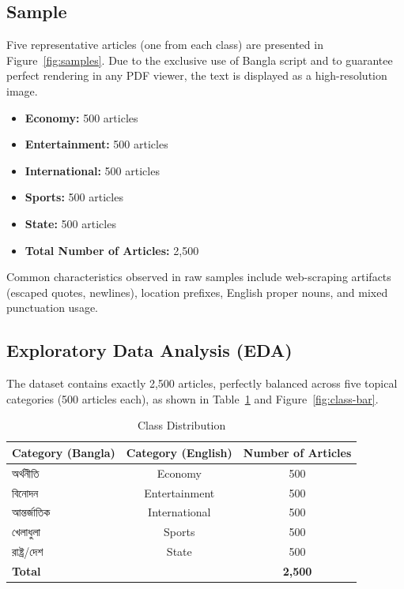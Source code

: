 \documentclass[pdflatex,sn-mathphys-num]{sn-jnl}
\newcommand{\bn}[1]{{\bengalifont #1}}
\theoremstyle{thmstyleone}\newtheorem{theorem}{Theorem}
\theoremstyle{thmstyletwo}\newtheorem{example}{Example}\newtheorem{remark}{Remark}
\theoremstyle{thmstylethree}\newtheorem{definition}{Definition}
\begin{document}
\subsection{Sample}
\label{subsec:sample}

Five representative articles (one from each class) are presented in Figure~\ref{fig:samples}. Due to the exclusive use of Bangla script and to guarantee perfect rendering in any PDF viewer, the text is displayed as a high-resolution image.

\begin{itemize}
    \item \textbf{Economy:} 500 articles
    \item \textbf{Entertainment:} 500 articles
    \item \textbf{International:} 500 articles
    \item \textbf{Sports:} 500 articles
    \item \textbf{State:} 500 articles
    \item \textbf{Total Number of Articles:} 2,500
\end{itemize}

Common characteristics observed in raw samples include web-scraping artifacts (escaped quotes, newlines), location prefixes, English proper nouns, and mixed punctuation usage.




\subsection{Exploratory Data Analysis (EDA)}
\label{subsec:eda}

The dataset contains exactly 2,500 articles, perfectly balanced across five topical categories (500 articles each), as shown in Table~\ref{tab:class-dist} and Figure~\ref{fig:class-bar}.

\begin{table}[!htbp]
    \centering
    \captionsetup{justification=centering} %
    \caption{Class Distribution}
    \label{tab:class-dist}
    \renewcommand{\arraystretch}{1.8}
    \setlength{\tabcolsep}{12pt}
    \begin{tabular}{|l|c|c|}
        \hline
        \textbf{Category (Bangla)} & \textbf{Category (English)} & \textbf{Number of Articles} \\
        \hline
        \bn{অর্থনীতি}       & Economy       & 500 \\
        \hline
        \bn{বিনোদন}         & Entertainment & 500 \\
        \hline
        \bn{আন্তর্জাতিক}    & International & 500 \\
        \hline
        \bn{খেলাধুলা}       & Sports        & 500 \\
        \hline
        \bn{রাষ্ট্র/দেশ}     & State         & 500 \\
        \hline
        \textbf{Total}      &               & \textbf{2,500} \\
        \hline
    \end{tabular}
\end{table}
\end{document}
